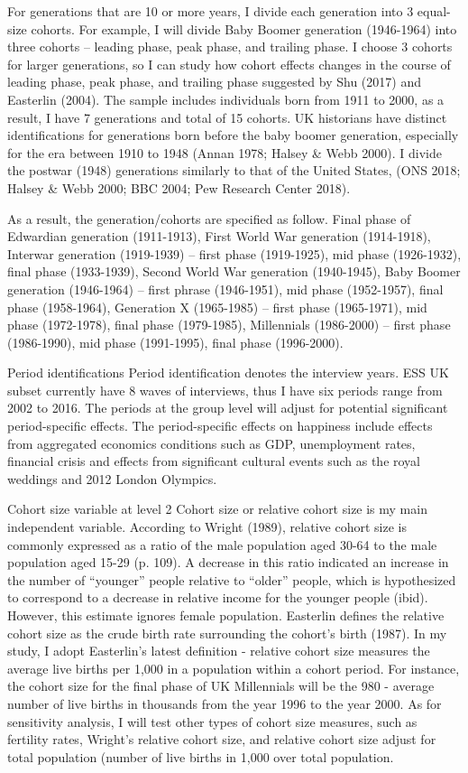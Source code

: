For generations that are 10 or more years, I divide each generation into 3 equal-size cohorts. For example, I will divide Baby Boomer generation (1946-1964) into three cohorts – leading phase, peak phase, and trailing phase. I choose 3 cohorts for larger generations, so I can study how cohort effects changes in the course of leading phase, peak phase, and trailing phase suggested by Shu (2017) and Easterlin (2004). The sample includes individuals born from 1911 to 2000, as a result, I have 7 generations and total of 15 cohorts. UK historians have distinct identifications for generations born before the baby boomer generation, especially for the era between 1910 to 1948 (Annan 1978; Halsey & Webb 2000). I divide the postwar (1948) generations similarly to that of the United States, (ONS 2018; Halsey & Webb 2000; BBC 2004; Pew Research Center 2018).

As a result, the generation/cohorts are specified as follow. Final phase of Edwardian generation (1911-1913), First World War generation (1914-1918), Interwar generation (1919-1939) – first phase (1919-1925), mid phase (1926-1932), final phase (1933-1939), Second World War generation (1940-1945),  Baby Boomer generation (1946-1964) – first phrase (1946-1951), mid phase (1952-1957), final phase (1958-1964), Generation X (1965-1985) – first phase (1965-1971), mid phase (1972-1978), final phase (1979-1985), Millennials (1986-2000) – first phase (1986-1990), mid phase (1991-1995), final phase (1996-2000).

Period identifications
Period identification denotes the interview years. ESS UK subset currently have 8 waves of interviews, thus I have six periods range from 2002 to 2016. The periods at the group level will adjust for potential significant period-specific effects. The period-specific effects on happiness include effects from aggregated economics conditions such as GDP, unemployment rates, financial crisis and effects from significant cultural events such as the royal weddings and 2012 London Olympics.

Cohort size variable at level 2
Cohort size or relative cohort size is my main independent variable. According to Wright (1989), relative cohort size is commonly expressed as a ratio of the male population aged 30-64 to the male population aged 15-29 (p. 109). A decrease in this ratio indicated an increase in the number of “younger” people relative to “older” people, which is hypothesized to correspond to a decrease in relative income for the younger people (ibid). However, this estimate ignores female population. Easterlin defines the relative cohort size as the crude birth rate surrounding the cohort’s birth (1987). In my study, I adopt Easterlin’s latest definition - relative cohort size measures the average live births per 1,000 in a population within a cohort period. For instance, the cohort size for the final phase of UK Millennials will be the 980 - average number of live births in thousands from the year 1996 to the year 2000. As for sensitivity analysis, I will test other types of cohort size measures, such as fertility rates, Wright’s relative cohort size, and relative cohort size adjust for total population (number of live births in 1,000 over total population.

